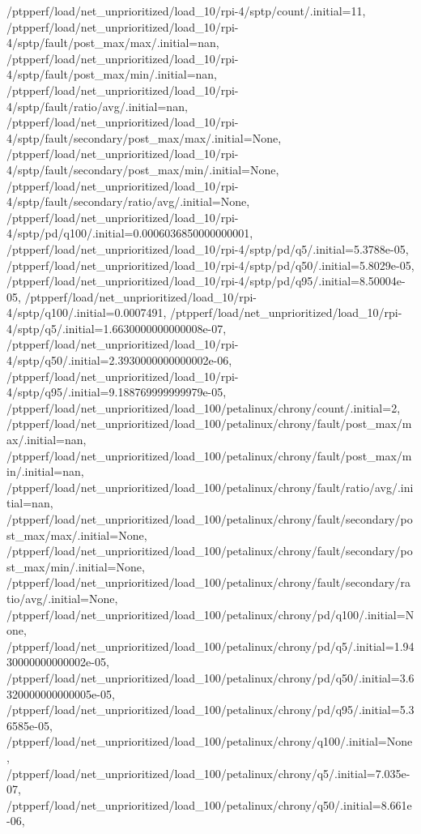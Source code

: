 {    /ptpperf/load/net_unprioritized/load_10/rpi-4/sptp/count/.initial=11,
    /ptpperf/load/net_unprioritized/load_10/rpi-4/sptp/fault/post_max/max/.initial=nan,
    /ptpperf/load/net_unprioritized/load_10/rpi-4/sptp/fault/post_max/min/.initial=nan,
    /ptpperf/load/net_unprioritized/load_10/rpi-4/sptp/fault/ratio/avg/.initial=nan,
    /ptpperf/load/net_unprioritized/load_10/rpi-4/sptp/fault/secondary/post_max/max/.initial=None,
    /ptpperf/load/net_unprioritized/load_10/rpi-4/sptp/fault/secondary/post_max/min/.initial=None,
    /ptpperf/load/net_unprioritized/load_10/rpi-4/sptp/fault/secondary/ratio/avg/.initial=None,
    /ptpperf/load/net_unprioritized/load_10/rpi-4/sptp/pd/q100/.initial=0.0006036850000000001,
    /ptpperf/load/net_unprioritized/load_10/rpi-4/sptp/pd/q5/.initial=5.3788e-05,
    /ptpperf/load/net_unprioritized/load_10/rpi-4/sptp/pd/q50/.initial=5.8029e-05,
    /ptpperf/load/net_unprioritized/load_10/rpi-4/sptp/pd/q95/.initial=8.50004e-05,
    /ptpperf/load/net_unprioritized/load_10/rpi-4/sptp/q100/.initial=0.0007491,
    /ptpperf/load/net_unprioritized/load_10/rpi-4/sptp/q5/.initial=1.6630000000000008e-07,
    /ptpperf/load/net_unprioritized/load_10/rpi-4/sptp/q50/.initial=2.3930000000000002e-06,
    /ptpperf/load/net_unprioritized/load_10/rpi-4/sptp/q95/.initial=9.188769999999979e-05,
    /ptpperf/load/net_unprioritized/load_100/petalinux/chrony/count/.initial=2,
    /ptpperf/load/net_unprioritized/load_100/petalinux/chrony/fault/post_max/max/.initial=nan,
    /ptpperf/load/net_unprioritized/load_100/petalinux/chrony/fault/post_max/min/.initial=nan,
    /ptpperf/load/net_unprioritized/load_100/petalinux/chrony/fault/ratio/avg/.initial=nan,
    /ptpperf/load/net_unprioritized/load_100/petalinux/chrony/fault/secondary/post_max/max/.initial=None,
    /ptpperf/load/net_unprioritized/load_100/petalinux/chrony/fault/secondary/post_max/min/.initial=None,
    /ptpperf/load/net_unprioritized/load_100/petalinux/chrony/fault/secondary/ratio/avg/.initial=None,
    /ptpperf/load/net_unprioritized/load_100/petalinux/chrony/pd/q100/.initial=None,
    /ptpperf/load/net_unprioritized/load_100/petalinux/chrony/pd/q5/.initial=1.9430000000000002e-05,
    /ptpperf/load/net_unprioritized/load_100/petalinux/chrony/pd/q50/.initial=3.6320000000000005e-05,
    /ptpperf/load/net_unprioritized/load_100/petalinux/chrony/pd/q95/.initial=5.36585e-05,
    /ptpperf/load/net_unprioritized/load_100/petalinux/chrony/q100/.initial=None,
    /ptpperf/load/net_unprioritized/load_100/petalinux/chrony/q5/.initial=7.035e-07,
    /ptpperf/load/net_unprioritized/load_100/petalinux/chrony/q50/.initial=8.661e-06,
}
